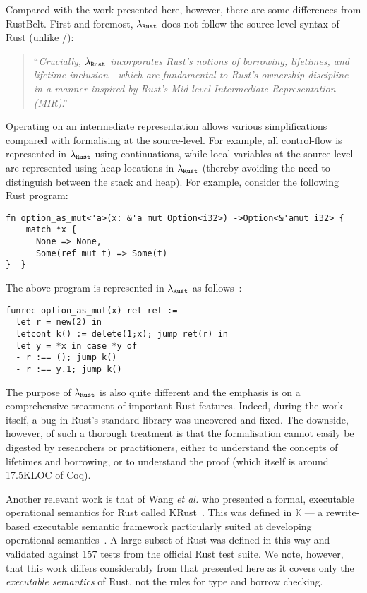 Compared with the work presented here, however, there are some
differences from RustBelt.  First and foremost, ${\tt\lambda_{Rust}}$
does not follow the source-level syntax of Rust (unlike \FR/):

\begin{quote}
``{\em Crucially, ${\tt\lambda_{Rust}}$ incorporates Rust's notions of
borrowing, lifetimes, and lifetime inclusion---which are fundamental
to Rust's ownership discipline---in a manner inspired by Rust's
Mid-level Intermediate Representation (MIR)}.''~\cite{JJKD18}
\end{quote}

Operating on an intermediate representation allows various
simplifications compared with formalising at the source-level.  For
example, all control-flow is represented in ${\tt\lambda_{Rust}}$
using continuations, while local variables at the source-level are
represented using heap locations in ${\tt\lambda_{Rust}}$ (thereby
avoiding the need to distinguish between the stack and heap).  For
example, consider the following Rust program:

\begin{lstlisting}
fn option_as_mut<'a>(x: &'a mut Option<i32>) ->Option<&'amut i32> {
    match *x {
      None => None,
      Some(ref mut t) => Some(t)
}  }
\end{lstlisting}

\noindent The above program is represented in ${\tt\lambda_{Rust}}$ as
follows~\cite{JJKD18}:

\begin{lstlisting}
funrec option_as_mut(x) ret ret :=
  let r = new(2) in
  letcont k() := delete(1;x); jump ret(r) in
  let y = *x in case *y of
  - r :== (); jump k()
  - r :== y.1; jump k()
\end{lstlisting}

The purpose of ${\tt\lambda_{Rust}}$ is also quite different and the
emphasis is on a comprehensive treatment of important Rust features.
Indeed, during the work itself, a bug in Rust's standard library was
uncovered and fixed.  The downside, however, of such a thorough
treatment is that the formalisation cannot easily be digested by
researchers or practitioners, either to understand the concepts of
lifetimes and borrowing, or to understand the proof (which itself is
around 17.5KLOC of Coq).

Another relevant work is that of Wang {\em et al.} who presented a
formal, executable operational semantics for Rust called
KRust~\cite{WSZZZ18}.  This was defined in $\mathbb{K}$ --- a
rewrite-based executable semantic framework particularly suited at
developing operational semantics~\cite{RS10b}.  A large subset of Rust
was defined in this way and validated against 157 tests from the
official Rust test suite.  We note, however, that this work differs
considerably from that presented here as it covers only the {\em
  executable semantics} of Rust, not the rules for type and borrow
checking.

